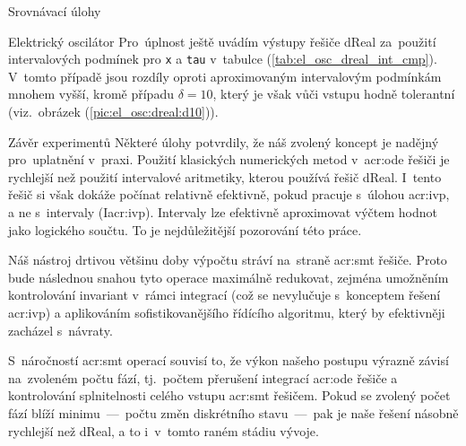 \documentclass[thesis=M,czech]{FITthesis}[2012/06/26]
\newcommand{\acrlabel}[1]{acr:#1}
\newcommand{\acr}[1]{\acrshort{\acrlabel{#1}}}
\newcommand{\id}[1]{\texttt{#1}}
\newcommand{\rf}[1]{\ref{#1}}
\newcommand{\picL}{pic}
\newcommand{\rfPic}[1]{(\rf{\picL:#1})}
\newcommand{\tabL}{tab}
\newcommand{\rfTab}[1]{(\rf{\tabL:#1})}
\begin{document}
\begin{section}{Srovnávací úlohy}
\begin{subsection}{Elektrický oscilátor}
Pro~úplnost ještě uvádím výstupy řešiče dReal
za~použití intervalových podmínek pro \id{x} a \id{tau}
v~tabulce \rfTab{el_osc_dreal_int_cmp}.
V~tomto případě jsou rozdíly
oproti aproximovaným intervalovým podmínkám
mnohem vyšší, kromě případu ${\delta = 10}$,
který je však vůči vstupu hodně tolerantní
(viz.~obrázek \rfPic{el_osc:dreal:d10}).
\end{subsection} %


\begin{subsection}{Závěr experimentů}\label{ss:exp:examples:conclusion}
Některé úlohy potvrdily, že náš zvolený koncept
je nadějný pro~uplatnění v~praxi.
Použití klasických numerických metod v~\acr{ode} řešiči
je rychlejší než použití intervalové aritmetiky,
kterou používá řešič dReal.
I~tento řešič si však dokáže počínat relativně efektivně,
pokud pracuje s~úlohou \acr{ivp},
a ne s~intervaly (I\acr{ivp}).
Intervaly lze efektivně aproximovat výčtem hodnot
jako logického součtu.
To je nejdůležitější pozorování této práce.

Náš nástroj drtivou většinu doby výpočtu stráví
na~straně \acr{smt} řešiče.
Proto bude následnou snahou
tyto operace maximálně redukovat,
zejména umožněním kontrolování invariant v~rámci integrací
(což se nevylučuje s~konceptem řešení \acr{ivp})
a aplikováním sofistikovanějšího
řídícího algoritmu, který by efektivněji zacházel s~návraty.

S~náročností \acr{smt} operací souvisí to,
že výkon našeho postupu výrazně závisí
na~zvoleném počtu fází,
tj.~počtem přerušení integrací \acr{ode} řešiče
a kontrolování splnitelnosti celého vstupu \acr{smt} řešičem.
Pokud se zvolený počet fází blíží
minimu~---~počtu změn diskrétního
stavu~---~pak je naše řešení násobně rychlejší než dReal,
a to i~v~tomto raném stádiu vývoje.
\end{subsection} %


\end{section} %

\end{document}
